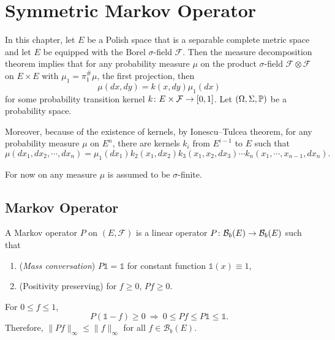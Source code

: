 \chapter{Symmetric Markov Operator}

In this chapter, let $E$ be a Polish space that is a separable complete metric space and let $E$ be equipped with the Borel $\sigma$-field $\mathcal{F}$. Then the measure decomposition theorem implies that for any probability measure $\mu$ on the product $\sigma$-field $\mathcal{F} \otimes \mathcal{F}$ on $E \times E$ with $\mu_1 = \pi_1^{\#}\mu$, the first projection, then
\begin{equation*}
	\mu (dx,dy) = k(x,dy)\mu_1(dx)
\end{equation*}
for some probability transition kernel $k \colon E \times \mathcal{F} \rightarrow [0,1]$. Let $(\Omega,\Sigma,\mathbb{P})$ be a probability space.
\begin{rmk}
	Moreover, because of the existence of kernels, by Ionescu–Tulcea theorem, for any probability measure $\mu$ on $E^n$, there are kernels $k_i$ from $E^{i-1}$ to $E$ such that
	\begin{equation*}
		\mu(dx_1,dx_2,\cdots,dx_n) = \mu_1(dx_1)k_2(x_1,dx_2)k_3(x_1,x_2,dx_3)\cdots k_n(x_1,\cdots,x_{n-1},dx_n).
	\end{equation*}		
\end{rmk}
For now on any measure $\mu$ is assumed to be $\sigma$-finite.

\section{Markov Operator}

\begin{defn}
    A Markov operator $P$ on $(E,\mathcal{F})$ is a linear operator $P \colon \mathcal{B}_b(E) \rightarrow \mathcal{B}_b(E)$ such that
    \begin{enumerate}[label=(\arabic{*})]
    	\item (\emph{Mass conversation}) $P\mathds{1} = \mathds{1}$ for constant function $\mathds{1}(x) \equiv 1$,
		\item (Positivity preserving) for $f \geq 0$, $Pf \geq 0$.
    \end{enumerate}
\end{defn}
\begin{rmk}
    For $0 \leq f \leq 1$,
    \begin{equation*}
    	P(\mathds{1}-f) \geq 0~\Rightarrow~0 \leq P f \leq P \mathds{1} \leq \mathds{1}.
    \end{equation*}
    Therefore, $\|P f\|_{\infty} \leq\|f\|_{\infty}$ for all $f \in \mathcal{B}_b(E)$.
\end{rmk}

